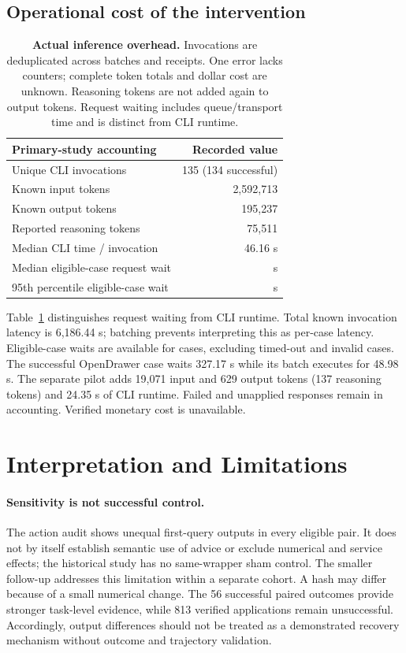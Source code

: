 \documentclass[10pt,twocolumn,letterpaper]{article}
\begin{document}
\subsection{Operational cost of the intervention}
\begin{table}[t]
\centering\small
\begin{tabular}{@{}lr@{}}
\toprule
Primary-study accounting & Recorded value\\
\midrule
Unique CLI invocations &135 (134 successful)\\
Known input tokens &2,592,713\\
Known output tokens &195,237\\
Reported reasoning tokens &75,511\\
Median CLI time / invocation &46.16 s\\
Median eligible-case request wait &\WaitMedian{} s\\
95th percentile eligible-case wait &\WaitPninetyfive{} s\\
\bottomrule
\end{tabular}
\caption{\textbf{Actual inference overhead.} Invocations are deduplicated across batches and receipts. One error lacks counters; complete token totals and dollar cost are unknown. Reasoning tokens are not added again to output tokens. Request waiting includes queue/transport time and is distinct from CLI runtime.}
\label{tab:cost}
\end{table}
Table~\ref{tab:cost} distinguishes request waiting from CLI runtime. Total known invocation latency is 6,186.44 s; batching prevents interpreting this as per-case latency. Eligible-case waits are available for \WaitN{} cases, excluding timed-out and invalid cases. The successful OpenDrawer case waits 327.17 s while its batch executes for 48.98 s. The separate pilot adds 19,071 input and 629 output tokens (137 reasoning tokens) and 24.35 s of CLI runtime. Failed and unapplied responses remain in accounting. Verified monetary cost is unavailable.



\section{Interpretation and Limitations}
\label{sec:limits}
\paragraph{Sensitivity is not successful control.}
The action audit shows unequal first-query outputs in every eligible pair. It does not by itself establish semantic use of advice or exclude numerical and service effects; the historical study has no same-wrapper sham control. The smaller follow-up addresses this limitation within a separate cohort. A hash may differ because of a small numerical change. The 56 successful paired outcomes provide stronger task-level evidence, while 813 verified applications remain unsuccessful. Accordingly, output differences should not be treated as a demonstrated recovery mechanism without outcome and trajectory validation.
\end{document}
